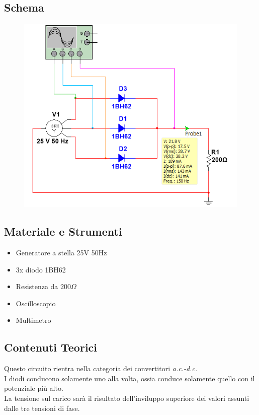\documentclass[12pt]{article}
\begin{document}
\subsection{Schema}
\begin{figure}[!h]
    \centering
    \includegraphics[scale=0.6]{schemsingsem.PNG}
\end{figure}
\subsection{Materiale e Strumenti}
\label{Materiale e Strumenti}
\begin{multicols}{2}
    \begin{itemize}
    \item Generatore a stella 25V 50Hz
    \item 3x diodo 1BH62
    \item Resistenza da $200\Omega$
    \end{itemize}
    \vfill\null
    \columnbreak
    \begin{itemize}
    \item Oscilloscopio
    \item Multimetro
    \end{itemize}
    \vfill\null
    \end{multicols}
\vspace{15pt}
\subsection{Contenuti Teorici}
Questo circuito rientra nella categoria dei convertitori \textit{a.c.-d.c.}\\
I diodi conducono solamente uno alla volta, ossia conduce solamente quello con il potenziale più alto.\\
La tensione sul carico  sarà il risultato dell'inviluppo superiore dei valori assunti dalle tre tensioni di fase.\\
\end{document}
